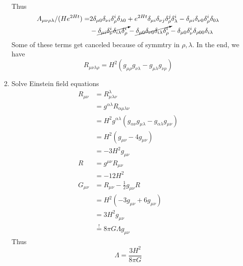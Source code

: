 \begin{enumerate}[label=(\alph*)]
\begin{align*}
      \end{align*}
      Thus 
      \begin{align*}
         A_{\mu\nu\rho\lambda}/(H e^{2Ht}) = &2\delta_{\mu 0} \delta_{\nu i} \delta^{i}_{\rho} \delta_{\lambda 0} + e^{2Ht} \delta_{\mu i} \delta_{\nu j} \delta^j_{\rho} \delta^{i}_\lambda - \delta_{\mu i } \delta_{\nu 0} \delta^i_\rho \delta_{0 \lambda} \\
                                             &- \cancelto{}{\delta_{\mu i} \delta^i_{\nu}  \delta_{i \lambda} \delta^i_{\rho}} - \cancelto{}{\delta_{\mu 0} \delta_{\nu 0} \delta_{i \lambda} \delta^i_{\rho}} - \delta_{\mu 0}\delta^i_{\nu} \delta_{\rho0 0 }\delta_{i \lambda}
      \end{align*}
      Some of these terms get canceled because of symmtry in $\rho, \lambda$. In the end, we have
      \begin{equation}
         R_{\mu\nu\lambda \rho} = H^2 (g_{\mu\rho} g_{\nu\lambda} - g_{\mu\lambda} g_{\nu\rho})
      \end{equation}
   \item  Solve Einstein field equations
      \begin{align*}
         R_{\mu\nu} &= R^\lambda_{\mu \lambda \nu} \\
                    &= g^{\alpha \lambda } R_{\alpha \mu \lambda \nu} \\
                    &= H^2 g^{\alpha \lambda} (g_{\alpha \nu} g_{\mu \lambda} - g_{\alpha \lambda} g_{\mu\nu}) \\
                    &= H^2 (g_{\mu\nu} - 4 g_{\mu\nu}) \\
                    &= -3 H^2  g_{\mu\nu} \\
         R &= g^{\mu\nu}R_{\mu\nu}\\
                    &= -12 H^2 \\
         G_{\mu\nu} &= R_{\mu\nu} - \frac{1}{2} g_{\mu\nu}R \\
                    &= H^2 \left( -3 g_{\mu\nu} + 6g_{\mu\nu} \right) \\
                    &= 3 H^2 g_{\mu\nu} \\
                    & \stackrel{!}{=} 8 \pi G \Lambda g_{\mu\nu} 
      \end{align*}
      Thus 
      \begin{equation}
        \Lambda = \frac{3H^2}{8 \pi G} 
      \end{equation}
\end{enumerate}
